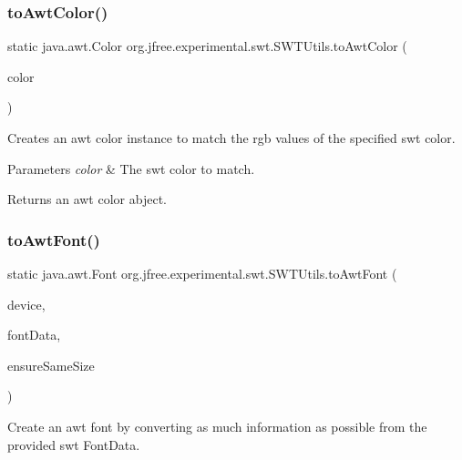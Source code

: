 \subsubsection{\texorpdfstring{to\+Awt\+Color()}{toAwtColor()}}
{\footnotesize\ttfamily static java.\+awt.\+Color org.\+jfree.\+experimental.\+swt.\+S\+W\+T\+Utils.\+to\+Awt\+Color (\begin{DoxyParamCaption}\item[{Color}]{color }\end{DoxyParamCaption})\hspace{0.3cm}{\ttfamily [static]}}

Creates an awt color instance to match the rgb values of the specified swt color.


\begin{DoxyParams}{Parameters}
{\em color} & The swt color to match. \\
\hline
\end{DoxyParams}
\begin{DoxyReturn}{Returns}
an awt color abject. 
\end{DoxyReturn}
\mbox{\label{classorg_1_1jfree_1_1experimental_1_1swt_1_1_s_w_t_utils_aac8c26e7234d3252fda50cbb65ca143e}} 
\subsubsection{\texorpdfstring{to\+Awt\+Font()}{toAwtFont()}\hspace{0.1cm}{\footnotesize\ttfamily [1/2]}}
{\footnotesize\ttfamily static java.\+awt.\+Font org.\+jfree.\+experimental.\+swt.\+S\+W\+T\+Utils.\+to\+Awt\+Font (\begin{DoxyParamCaption}\item[{Device}]{device,  }\item[{Font\+Data}]{font\+Data,  }\item[{boolean}]{ensure\+Same\+Size }\end{DoxyParamCaption})\hspace{0.3cm}{\ttfamily [static]}}

Create an awt font by converting as much information as possible from the provided swt {\ttfamily Font\+Data}. 

